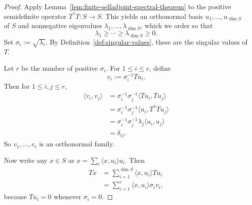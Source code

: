\begin{proof}
Apply Lemma~\ref{lem:finite-selfadjoint-spectral-theorem} to the positive
semidefinite operator \(T^\ast T:S\to S\). This yields an orthonormal basis
\(u_1,\dots,u_{\dim S}\) of \(S\) and nonnegative eigenvalues
\(\lambda_1,\dots,\lambda_{\dim S}\), which we order so that
\[
\lambda_1\ge \cdots \ge \lambda_{\dim S}\ge 0.
\]
Set \(\sigma_i:=\sqrt{\lambda_i}\). By
Definition~\ref{def:singular-values}, these are the singular values of \(T\).

Let \(r\) be the number of positive \(\sigma_i\). For \(1\le i\le r\), define
\[
v_i:=\sigma_i^{-1}Tu_i.
\]
Then for \(1\le i,j\le r\),
\begin{align*}
\langle v_i,v_j\rangle
&=
\sigma_i^{-1}\sigma_j^{-1}\langle Tu_i,Tu_j\rangle \\
&=
\sigma_i^{-1}\sigma_j^{-1}\langle u_i,T^\ast T u_j\rangle \\
&=
\sigma_i^{-1}\sigma_j^{-1}\lambda_j\langle u_i,u_j\rangle \\
&=
\delta_{ij}.
\end{align*}
So \(v_1,\dots,v_r\) is an orthonormal family.

Now write any \(x\in S\) as \(x=\sum_i \langle x,u_i\rangle u_i\). Then
\begin{align*}
Tx
&=
\sum_{i=1}^{\dim S}\langle x,u_i\rangle Tu_i \\
&=
\sum_{i=1}^{r}\langle x,u_i\rangle \sigma_i v_i,
\end{align*}
because \(Tu_i=0\) whenever \(\sigma_i=0\).
\end{proof}

